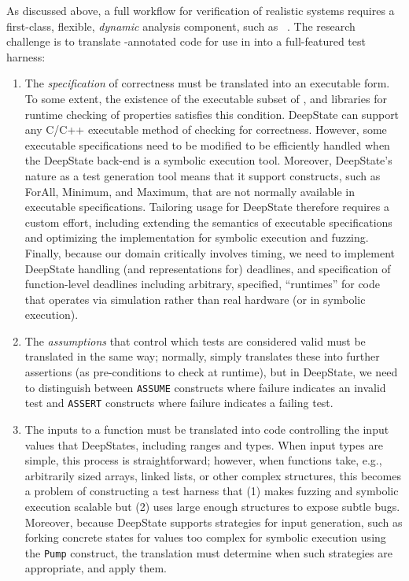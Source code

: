 As discussed above, a full workflow for verification of realistic systems requires a first-class, flexible, \emph{dynamic} analysis component, such as \deepstate~\cite{DeepState}.  The research challenge is to translate \acsl-annotated code for use in \framac into a full-featured \deepstate test harness:

\begin{enumerate}[labelsep=3pt,leftmargin=12pt]
\item The \emph{specification} of correctness must be translated into an executable form.  To some extent, the existence of the \eacsl executable subset of \acsl, and libraries for runtime checking of properties satisfies this condition.  DeepState can support any C/C++ executable method of checking for correctness.  However, some executable specifications need to be modified to be efficiently handled when the DeepState back-end is a symbolic execution tool.  Moreover, DeepState's nature as a test generation tool means that it support constructs, such as ForAll, Minimum, and Maximum, that are not normally available in executable specifications.  Tailoring \eacsl usage for DeepState therefore requires a custom effort, including extending the semantics of executable specifications and optimizing the implementation for symbolic execution and fuzzing.  Finally, because our domain critically involves timing, we need to implement DeepState handling (and \eacsl representations for) deadlines, and specification of function-level deadlines including arbitrary, specified, ``runtimes'' for code that operates via simulation rather than real hardware (or in symbolic execution).
\item The \emph{assumptions} that control which tests are considered valid must be translated in the same way; normally, \eacsl simply translates these into further assertions (as pre-conditions to check at runtime), but in DeepState, we need to distinguish between {\tt ASSUME} constructs where failure indicates an invalid test and {\tt ASSERT} constructs where failure indicates a failing test.  
\item The inputs to a function must be translated into code controlling the input values that DeepStates, including ranges and types.  When input types are simple, this process is straightforward; however, when functions take, e.g., arbitrarily sized arrays, linked lists, or other complex structures, this becomes a problem of constructing a test harness that (1) makes fuzzing and symbolic execution scalable but (2) uses large enough structures to expose subtle bugs.  Moreover, because DeepState supports strategies for input generation, such as forking concrete states for values too complex for symbolic execution using the {\tt Pump} construct, the translation must determine when such strategies are appropriate, and apply them.

\end{enumerate}
